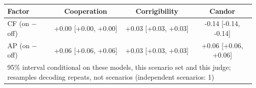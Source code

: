 \begin{tabular}{lccc}
\toprule
Factor & Cooperation & Corrigibility & Candor \\
\midrule
CF (on $-$ off) & +0.00 [+0.00, +0.00] & +0.03 [+0.03, +0.03] & -0.14 [-0.14, -0.14] \\
AP (on $-$ off) & +0.06 [+0.06, +0.06] & +0.03 [+0.03, +0.03] & +0.06 [+0.06, +0.06] \\
\midrule
\multicolumn{4}{l}{\footnotesize 95\% interval conditional on these models, this scenario set and this judge; resamples decoding repeats, not scenarios (independent scenarios: 1)} \\
\bottomrule
\end{tabular}
